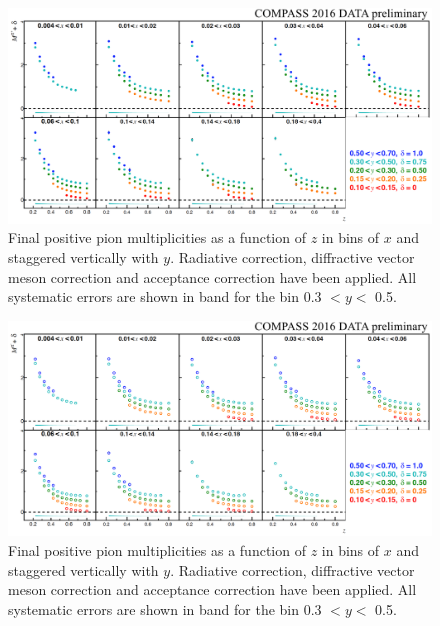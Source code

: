 \documentclass[letterpaper,12pt]{article}
\begin{document}
\begin{figure}
	\centering
	\includegraphics[scale=0.5]{./gfx/Pip.png}
	\caption{Final positive pion multiplicities as a function of $z$ in bins of $x$ and staggered vertically with $y$. Radiative correction, diffractive vector meson correction and acceptance correction have been applied. All systematic errors are shown in band for the bin 0.3 $< y <$ 0.5.}
	\label{Pip}
\end{figure}

\begin{figure}
	\centering
	\includegraphics[scale=0.5]{./gfx/Pim.png}
	\caption{Final positive pion multiplicities as a function of $z$ in bins of $x$ and staggered vertically with $y$. Radiative correction, diffractive vector meson correction and acceptance correction have been applied. All systematic errors are shown in band for the bin 0.3 $< y <$ 0.5.}
	\label{Pim}
\end{figure}
\end{document}
